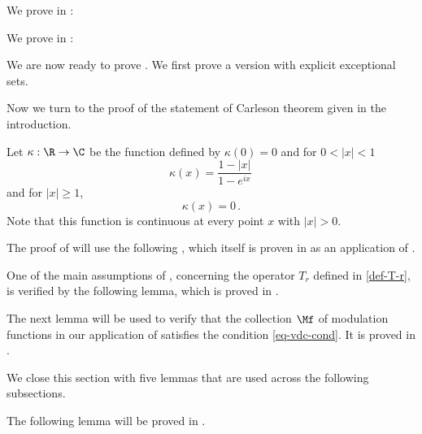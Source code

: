 


We prove in :

We prove in :

We are now ready to prove . We first prove a version with explicit exceptional sets.



Now we turn to the proof of the statement of Carleson theorem given in the introduction.


Let $\kappa:\R\to \C$ be the function defined by
$\kappa(0)=0$ and for $0<|x|<1$
\begin{equation}\label{eq-hilker}
\kappa(x)=\frac { 1-|x|}{1-e^{ix}}\,
\end{equation}
and for $|x|\ge 1$,
\begin{equation}\label{eq-hilker1}
\kappa(x)=0\, .
\end{equation}
Note that this function is continuous at every point $x$ with $|x|>0$.

The proof of  will
use the following , which itself is proven
 in  as an application of
 .


One of the main assumptions of , concerning the operator $T_r$ defined in \eqref{def-T-r}, is verified by the following lemma, which is proved in .

The next lemma will be used to verify that the collection $\Mf$ of modulation functions in our application of  satisfies the condition \eqref{eq-vdc-cond}.
It is proved in .



We close this section with five lemmas that are used
across the following subsections.







The following lemma will be proved in .



